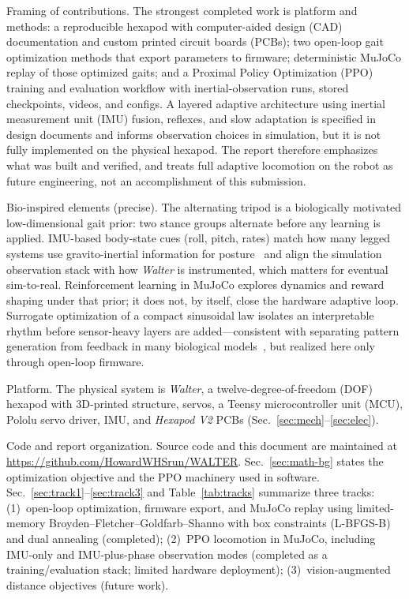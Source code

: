 \documentclass[11pt]{article}
\begin{document}
Framing of contributions. The strongest completed work is platform and methods: a reproducible hexapod with computer-aided design (CAD) documentation and custom printed circuit boards (PCBs); two open-loop gait optimization methods that export parameters to firmware; deterministic MuJoCo replay of those optimized gaits; and a Proximal Policy Optimization (PPO) training and evaluation workflow with inertial-observation runs, stored checkpoints, videos, and configs. A layered adaptive architecture using inertial measurement unit (IMU) fusion, reflexes, and slow adaptation is specified in design documents and informs observation choices in simulation, but it is not fully implemented on the physical hexapod. The report therefore emphasizes what was built and verified, and treats full adaptive locomotion on the robot as future engineering, not an accomplishment of this submission.

Bio-inspired elements (precise). The alternating tripod is a biologically motivated low-dimensional gait prior: two stance groups alternate before any learning is applied. IMU-based body-state cues (roll, pitch, rates) match how many legged systems use gravito-inertial information for posture~\cite{valenti2015quaternion,bai2019posture} and align the simulation observation stack with how \emph{Walter} is instrumented, which matters for eventual sim-to-real. Reinforcement learning in MuJoCo explores dynamics and reward shaping under that prior; it does not, by itself, close the hardware adaptive loop. Surrogate optimization of a compact sinusoidal law isolates an interpretable rhythm before sensor-heavy layers are added---consistent with separating pattern generation from feedback in many biological models~\cite{chen2021adaptive}, but realized here only through open-loop firmware.

Platform. The physical system is \emph{Walter}, a twelve-degree-of-freedom (DOF) hexapod with 3D-printed structure, servos, a Teensy microcontroller unit (MCU), Pololu servo driver, IMU, and \emph{Hexapod V2} PCBs (Sec.~\ref{sec:mech}--\ref{sec:elec}).

Code and report organization. Source code and this document are maintained at \url{https://github.com/HowardWHSrun/WALTER}. Sec.~\ref{sec:math-bg} states the optimization objective and the PPO machinery used in software. Sec.~\ref{sec:track1}--\ref{sec:track3} and Table~\ref{tab:tracks} summarize three tracks: (1)~open-loop optimization, firmware export, and MuJoCo replay using limited-memory Broyden--Fletcher--Goldfarb--Shanno with box constraints (L-BFGS-B) and dual annealing (completed); (2)~PPO locomotion in MuJoCo, including IMU-only and IMU-plus-phase observation modes (completed as a training/evaluation stack; limited hardware deployment); (3)~vision-augmented distance objectives (future work).
\end{document}

